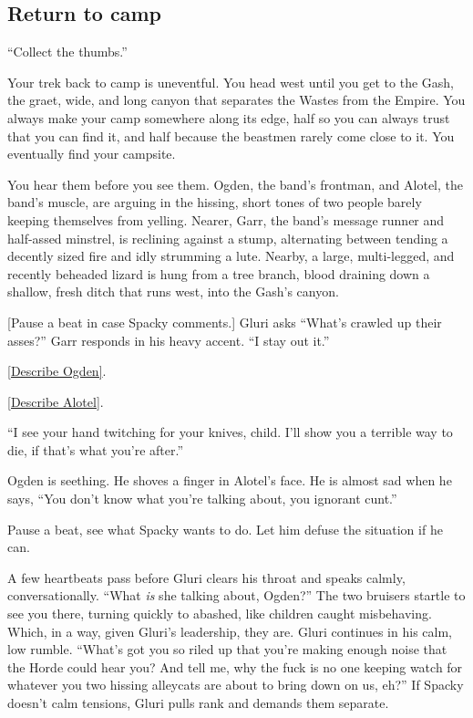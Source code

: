 \pagebreak

\begin{multicols}{2}
\subsection{Return to camp}
``Collect the thumbs.''

Your trek back to camp is uneventful.
You head west until you get to the Gash, the graet, wide, and long canyon that separates the
Wastes from the Empire.
You always make your camp somewhere along its edge, half so you can always trust that you can find
it, and half because the beastmen rarely come close to it.
You eventually find your campsite.

\begin{aloud}
You hear them before you see them.
Ogden, the band's frontman, and Alotel, the band's muscle, are arguing in the hissing, short
tones of two people barely keeping themselves from yelling.
Nearer, Garr, the band's message runner and half-assed minstrel, is reclining against a stump,
alternating between tending a decently sized fire and idly strumming a lute.
Nearby, a large, multi-legged, and recently beheaded lizard is hung from a tree branch,
blood draining down a shallow, fresh ditch that runs west, into the Gash's canyon.
\end{aloud}

[Pause a beat in case Spacky comments.]
Gluri asks ``What's crawled up their asses?''
Garr responds in his heavy accent.
``I stay out it.''

\hyperref[description:ogden]{[Describe Ogden]}.

\hyperref[description:alotel]{[Describe Alotel]}.

``I see your hand twitching for your knives, child.
I'll show you a terrible way to die, if that's what you're after.''

Ogden is seething.
He shoves a finger in Alotel's face.
He is almost sad when he says,
``You don't know what you're talking about, you ignorant cunt.''

Pause a beat, see what Spacky wants to do.
Let him defuse the situation if he can.

A few heartbeats pass before Gluri clears his throat and speaks calmly, conversationally.
``What \emph{is} she talking about, Ogden?''
The two bruisers startle to see you there, turning quickly to abashed, like children caught
misbehaving.
Which, in a way, given Gluri's leadership, they are.
Gluri continues in his calm, low rumble.
``What's got you so riled up that you're making enough noise that the Horde could hear you?
And tell me, why the fuck is no one keeping watch for whatever you two hissing alleycats are
about to bring down on us, eh?''
If Spacky doesn't calm tensions, Gluri pulls rank and demands them separate.


\end{multicols}
